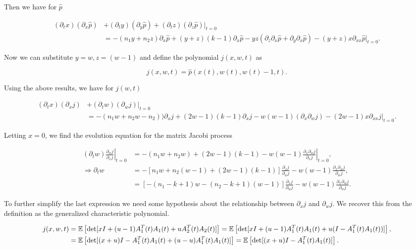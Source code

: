     Then we have for $\hat p$

    \begin{align*}
        (\partial_t x)(\partial_x \hat p) &+ (\partial_t y)(\partial_y \hat p) + (\partial_t z)(\partial_z \hat p)|_{t=0} \\ 
        &= -(n_1y + n_2 z)\partial_x \hat p + (y+z)(k-1)\partial_x \hat p - yz (\partial_z\partial_x \hat p + \partial_y\partial_x \hat p) - (y+z)x\partial_{xx} \hat p|_{t=0}.
    \end{align*}

    Now we can substitute $y = w, z = (w-1)$ and define the polynomial $j(x,w,t)$ as

    \begin{equation*}
        j(x,w,t) = \hat p(x(t), w(t), w(t)-1, t).
    \end{equation*}

    Using the above results, we have for $j(w,t)$

    \begin{align*}
        (\partial_t x)(\partial_x j) &+ (\partial_t w)(\partial_w j)|_{t=0} \\
        &= -(n_1w + n_2w-n_2))\partial_x j + (2w-1)(k-1)\partial_x j - w(w-1)(\partial_x\partial_w j) - (2w-1)x\partial_{xx} j|_{t=0}.
    \end{align*}

    Letting $x=0$, we find the evolution equation for the matrix Jacobi process 

    \begin{align*}
        \left.(\partial_t w)\frac{\partial_w j}{\partial_x j}\right|_{t=0} &= \left.-(n_1w + n_2w) + (2w-1)(k-1) - w(w-1)\frac{\partial_x\partial_w j}{\partial_x j}\right|_{t=0},\\
        \Rightarrow \partial_t w &= -[n_1w + n_2 (w-1) +(2w-1)(k-1)]\frac{\partial_x j}{\partial_w j} - w(w-1)\frac{\partial_x\partial_w j}{\partial_w j},\\ 
        &= [-(n_1-k+1)w - (n_2 -k+1)(w-1)]\frac{\partial_x j}{\partial_w j} - w(w-1)\frac{\partial_x\partial_w j}{\partial_w j}.
    \end{align*}

    To further simplify the last expression we need some hypothesis about the relationship between $\partial_x j$ and $\partial_w j$. We recover this from the definition as the generalized characteristic polynomial.

    \begin{align*}
        j(x,w,t) &= \mathbb E \left[  \det[ xI + (u-1)A^T_1(t) A_1(t) + u A^T_2(t) A_2(t) ]  \right] = \mathbb E \left[  \det[ xI + (u-1)A^T_1(t) A_1(t) + u (I - A^T_1(t) A_1(t)) ]  \right], \\
        &= \mathbb E \left[  \det[ (x+u)I - A^T_1(t) A_1(t) +(u-u)A^T_1(t) A_1(t) ]  \right] = \mathbb E \left[  \det[ (x+u)I - A^T_1(t) A_1(t)]  \right].
    \end{align*}

